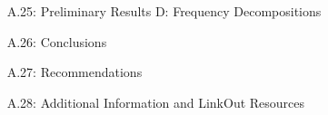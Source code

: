 \documentclass[final]{beamer}
\newlength{\sepwid}
\newlength{\onecolwid}
\theoremstyle{definition}
\begin{document}
\begin{frame}[t]
\begin{columns}[t]
\begin{column}{\sepwid}\end{column} %

\begin{column}{\onecolwid} %

\begin{alertblock}{A.25: Preliminary Results D: Frequency Decompositions}
	

\end{alertblock}


\begin{alertblock}{A.26: Conclusions}

\end{alertblock}


\begin{alertblock}{A.27: Recommendations}
	
\end{alertblock}


\begin{alertblock}{A.28: Additional Information and LinkOut Resources}


\end{alertblock}
\end{column}
\end{columns}
\end{frame}
\end{document}
